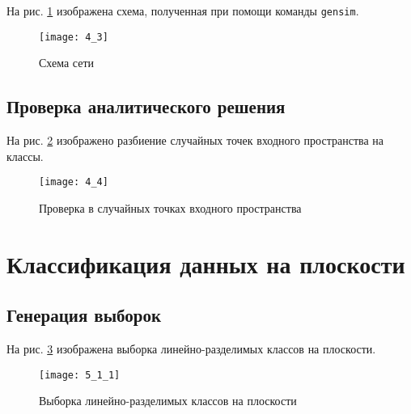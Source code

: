 
На рис. \ref{fig:4_3} изображена схема, полученная при помощи команды \verb+gensim+.

\begin{figure}[H]
\begin{center}
	\texttt{[image: 4\_3]}
	\caption{Схема сети}
	\label{fig:4_3}
\end{center}
\end{figure}

\subsection{Проверка аналитического решения}


На рис. \ref{fig:4_4} изображено разбиение случайных точек входного пространства на классы.

\begin{figure}[H]
\begin{center}
	\texttt{[image: 4\_4]}
	\caption{Проверка в случайных точках входного пространства}
	\label{fig:4_4}
\end{center}
\end{figure}

\section{Классификация данных на плоскости}

\subsection{Генерация выборок}


На рис. \ref{fig:5_1_1} изображена выборка линейно-разделимых классов на плоскости.

\begin{figure}[H]
\begin{center}
	\texttt{[image: 5\_1\_1]}
	\caption{Выборка линейно-разделимых классов на плоскости}
	\label{fig:5_1_1}
\end{center}
\end{figure}

